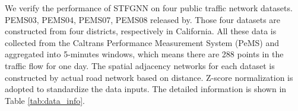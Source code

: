 \documentclass[letterpaper]{article} \usepackage{aaai21}  \usepackage{times}  \usepackage{helvet} \usepackage{courier}  \usepackage[hyphens]{url}  \usepackage{graphicx} \urlstyle{rm} \def\UrlFont{\rm}  \usepackage{natbib}  \usepackage{caption} \frenchspacing  \setlength{\pdfpagewidth}{8.5in}  \setlength{\pdfpageheight}{11in}  \usepackage{multirow}
\begin{document}
We verify the performance of STFGNN on four public traffic network datasets. PEMS03, PEMS04, PEMS07, PEMS08 released by\cite{song2020spatial}. Those four datasets are constructed from four districts, respectively in California. All these data is collected from the Caltrans Performance Measurement System (PeMS) and aggregated into 5-minutes windows, which means there are 288 points in the traffic flow for one day. The spatial adjacency networks for each dataset is constructed by actual road network based on distance. Z-score normalization is adopted to standardize the data inputs. The detailed information is shown in Table \ref{tab:data_info}.


\begin{table*}[!htb]
	\centering
\end{table*}
\end{document}
